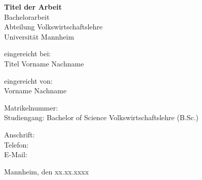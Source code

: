 
\begin{titlepage}

\begin{center}

\vspace*{1,2cm}

\huge {\bfseries Titel der Arbeit}\\[1.8cm]

\Large {Bachelorarbeit}\\[1cm]

\large {Abteilung Volkswirtschaftslehre}\\[0.2cm]

\large {Universität Mannheim}\\[0.5cm]

\end{center}

\vspace{3cm}

\noindent eingereicht bei:\\
Titel Vorname Nachname

\vspace{1cm}

\noindent eingereicht von:\\
Vorname Nachname

\vspace{1cm}

\noindent Matrikelnummer:\\
Studiengang: Bachelor of Science Volkswirtschaftslehre (B.Sc.)

\vspace{1cm}

\noindent Anschrift:\\
Telefon:\\
E-Mail:\\

\vspace{1cm}

\noindent Mannheim, den xx.xx.xxxx

\setcounter{page}{0}\clearpage

\end{titlepage}

\endinput
